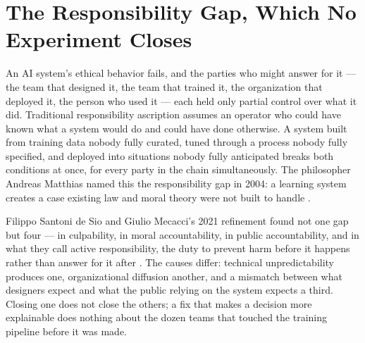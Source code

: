 \section{The Responsibility Gap, Which No Experiment Closes}
\label{sec:11.10}
An AI system's ethical behavior fails, and the parties who might answer for it — the team that designed it, the team that trained it, the organization that deployed it, the person who used it — each held only partial control over what it did. Traditional responsibility ascription assumes an operator who could have known what a system would do and could have done otherwise. A system built from training data nobody fully curated, tuned through a process nobody fully specified, and deployed into situations nobody fully anticipated breaks both conditions at once, for every party in the chain simultaneously. The philosopher Andreas Matthias named this the responsibility gap in 2004: a learning system creates a case existing law and moral theory were not
built to handle \autocite{matthias2004responsibility}.

Filippo Santoni de Sio and Giulio Mecacci's 2021 refinement found not one gap but four — in culpability, in moral accountability, in public accountability, and in what they call active responsibility, the duty to prevent harm before it happens rather than answer for it after \autocite{santonidesio2021four}. The causes differ: technical unpredictability produces one, organizational diffusion another, and a mismatch between what designers expect and what the public relying on the system expects a third. Closing one does not close the others; a fix that makes a decision more explainable does nothing about the dozen teams that touched the training pipeline before it was made.

